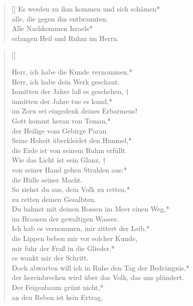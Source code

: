 \begin{verse}[\versewidth]
\vin Es werden zu ihm kommen und sich schämen*\\
\vin alle, die gegen ihn entbrannten.\\
Alle Nachkommen Israels*\\
erlangen Heil und Ruhm im Herrn.\\

\end{verse}

\vspace{0.6cm}

\begin{verse}[\versewidth]
 

Herr, ich habe die Kunde vernommen,*\\
Herr, ich habe dein Werk geschaut.\\
\vin Inmitten der Jahre laß es geschehen, †\\
\vin inmitten der Jahre tue es kund,*\\
\vin im Zorn sei eingedenk deines Erbarmens!\\
Gott kommt heran von Teman,*\\
der Heilige vom Gebirge Paran.\\
\vin Seine Hoheit überkleidet den Himmel,*\\
\vin die Erde ist von seinem Ruhm erfüllt.\\
Wie das Licht ist sein Glanz, † \\
von seiner Hand gehen Strahlen aus:*\\
die Hülle seiner Macht.\\
\vin So ziehst du aus, dein Volk zu retten,*\\
\vin zu retten deinen Gesalbten.\\ 
Du bahnst mit deinen Rossen im Meer einen Weg,*\\
im Brausen der gewaltigen Wasser.\\
\vin Ich hab es vernommen, mir zittert der Leib,*\\
\vin die Lippen beben mir vor solcher Kunde,\\
mir fuhr der Fraß in die Glieder,*\\
es wankt mir der Schritt.\\
\vin Doch abwarten will ich in Ruhe den Tag der Bedrängnis,*\\
\vin der hereinbrechen wird über das Volk, das uns plündert.\\
Der Feigenbaum grünt nicht,*\\
an den Reben ist kein Ertrag,\\

\end{verse}
